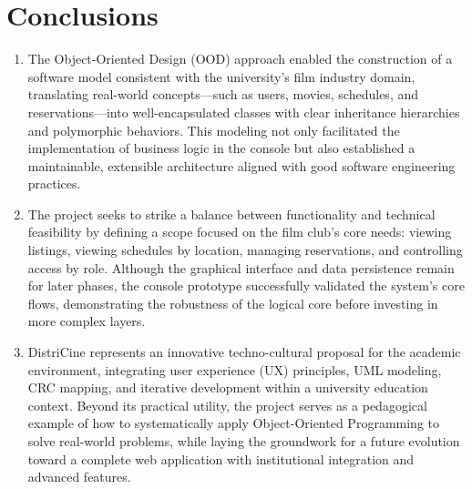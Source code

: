 \documentclass[12pt]{article}
\begin{document}
\section{Conclusions}
\begin{enumerate}
    \item The Object-Oriented Design (OOD) approach enabled the construction of a software model consistent with the university's film industry domain, translating real-world concepts—such as users, movies, schedules, and reservations—into well-encapsulated classes with clear inheritance hierarchies and polymorphic behaviors. This modeling not only facilitated the implementation of business logic in the console but also established a maintainable, extensible architecture aligned with good software engineering practices.

    \item The project seeks to strike a balance between functionality and technical feasibility by defining a scope focused on the film club's core needs: viewing listings, viewing schedules by location, managing reservations, and controlling access by role. Although the graphical interface and data persistence remain for later phases, the console prototype successfully validated the system's core flows, demonstrating the robustness of the logical core before investing in more complex layers.

    \item DistriCine represents an innovative techno-cultural proposal for the academic environment, integrating user experience (UX) principles, UML modeling, CRC mapping, and iterative development within a university education context. Beyond its practical utility, the project serves as a pedagogical example of how to systematically apply Object-Oriented Programming to solve real-world problems, while laying the groundwork for a future evolution toward a complete web application with institutional integration and advanced features.
\end{enumerate}
\end{document}
